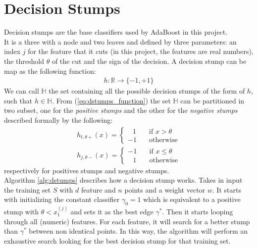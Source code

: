 \chapter{Decision Stumps}
Decision stumps are the base classifiers used by AdaBoost in this project.\\
It is a three with a node and two leaves and defined by three parameters: an index $j$ for the feature that it cuts (in this project, the features are real numbers), the threshold $\theta$ of the cut and the sign of the decision. A decision stump can be map as the following function:
\begin{align}
\label{eq:dstumps_function}
	h:\mathbb{R} \to \lbrace-1, +1\rbrace
\end{align}
We can call $\mathbb{H}$ the set containing all the possible decision stumps of the form of $h$, such that $h \in \mathbb{H}$. From (\ref{eq:dstumps_function}) the set $\mathbb{H}$ can be partitioned in two subset, one for the \textit{positive stumps} and the other for the \textit{negative stumps} described formally by the following:
\begin{align}
h_{t, \theta+}(x) =
\begin{cases}
\;\;\,1       & \quad \text{if } x > \theta\\
-1  & \quad \text{otherwise}
\end{cases}
\\
h_{j,\theta-}(x) =
\begin{cases}
-1			& \quad \text{if } x \leq \theta\\
\;\;\,1		& \quad \text{otherwise}
\end{cases}
\end{align}
respectively for positives stumps and negative stumps.\\
Algorithm \ref{alg:dstumps} describes how a decision stump works. Takes in input the training set $S$ with $d$ feature and $n$ points and a weight vector $w$. It starts with initializing the constant classifier $\gamma_{0} = 1$ which is equivalent to a positive stump with $\theta < x_{1}^{(j)}$ and sets it as the best edge $\gamma^{*}$. Then it starts looping through all (numeric) features. For each feature, it will search for a better stump than $\gamma^{*}$ between non identical points. In this way, the algorithm will perform an exhaustive search looking for the best decision stump for that training set. 

